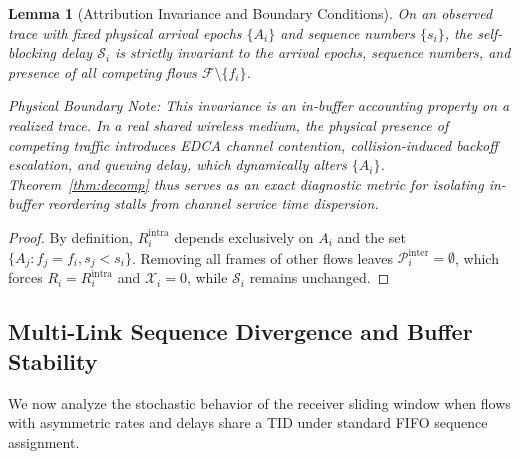 \documentclass[10pt,journal,compsoc]{IEEEtran}
\newtheorem{lemma}{Lemma}
\begin{document}
\begin{lemma}[Attribution Invariance and Boundary Conditions]
\label{lem:invariance}
On an observed trace with fixed physical arrival epochs $\{A_i\}$ and sequence numbers $\{s_i\}$, the self-blocking delay $\mathcal{S}_i$ is strictly invariant to the arrival epochs, sequence numbers, and presence of all competing flows $\mathcal{F} \setminus \{f_i\}$. 

\emph{Physical Boundary Note:} This invariance is an in-buffer accounting property on a realized trace. In a real shared wireless medium, the physical presence of competing traffic introduces EDCA channel contention, collision-induced backoff escalation, and queuing delay, which dynamically alters $\{A_i\}$. Theorem~\ref{thm:decomp} thus serves as an exact diagnostic metric for isolating in-buffer reordering stalls from channel service time dispersion.
\end{lemma}
\begin{proof}
By definition, $R_i^{\text{intra}}$ depends exclusively on $A_i$ and the set $\{A_j : f_j = f_i, s_j < s_i\}$. Removing all frames of other flows leaves $\mathcal{P}_i^{\text{inter}} = \emptyset$, which forces $R_i = R_i^{\text{intra}}$ and $\mathcal{X}_i = 0$, while $\mathcal{S}_i$ remains unchanged.
\end{proof}

\subsection{Multi-Link Sequence Divergence and Buffer Stability}

We now analyze the stochastic behavior of the receiver sliding window when flows with asymmetric rates and delays share a TID under standard FIFO sequence assignment.
\end{document}
